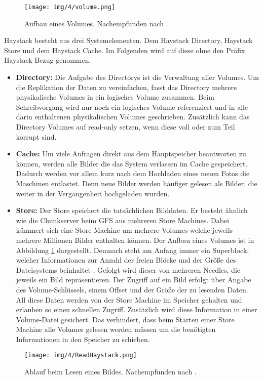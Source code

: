 \documentclass[12pt,oneside,a4paper,parskip]{scrbook}
\begin{document}
\begin{figure}
  \centering
  \texttt{[image: img/4/volume.png]}
  \caption[Aufbau eines Volumes]{ Aufbau eines Volumes. Nachempfunden nach \cite{haystack}.}
  \label{volume}
\end{figure}
Haystack besteht aus drei Systemelementen. Dem Haystack Directory, Haystack Store und dem Haystack Cache. Im Folgenden wird auf diese ohne den Präfix Haystack Bezug genommen.
\begin{itemize}
  \item \textbf{Directory:} Die Aufgabe des Directorys ist die Verwaltung aller Volumes. Um die Replikation der Daten zu vereinfachen, fasst das Directory mehrere physikalische Volumes in ein logisches Volume zusammen. Beim Schreibvorgang wird nur noch ein logisches Volume referenziert und in alle darin enthaltenen physikalischen Volumes geschrieben. Zusätzlich kann das Directory Volumes auf read-only setzen, wenn diese voll oder zum Teil korrupt sind.
  \item \textbf{Cache:} Um viele Anfragen direkt aus dem Hauptspeicher beantworten zu können, werden alle Bilder die das System verlassen im Cache gespeichert. Dadurch werden vor allem kurz nach dem Hochladen eines neuen Fotos die Maschinen entlastet. Denn neue Bilder werden häufiger gelesen als Bilder, die weiter in der Vergangenheit hochgeladen wurden. 
  \item \textbf{Store:} Der Store speichert die tatsächlichen Bilddaten. Er besteht ähnlich wie die Chunkserver beim GFS aus mehreren Store Machines. Dabei kümmert sich eine Store Machine um mehrere Volumes welche jeweils mehrere Millionen Bilder enthalten können. Der Aufbau eines Volumes ist in Abbildung \ref{volume} dargestellt. Demnach steht am Anfang immer ein Superblock, welcher Informationen zur Anzahl der freien Blöcke und der Größe des Dateisystems beinhaltet \cite{wiki:superblock}. Gefolgt wird dieser von mehreren Needles, die jeweils ein Bild repräsentieren. Der Zugriff auf ein Bild erfolgt über Angabe des Volume-Schlüssels, einem Offset und der Größe der zu lesenden Daten. All diese Daten werden von der Store Machine im Speicher gehalten und erlauben so einen schnellen Zugriff. Zusätzlich wird diese Information in einer Volume-Datei gesichert. Das verhindert, dass beim Starten einer Store Machine alle Volumes gelesen werden müssen um die benötigten Informationen in den Speicher zu schieben. 
\end{itemize}

\begin{figure}[h]
  \centering
  \texttt{[image: img/4/ReadHaystack.png]}
  \caption[Ablauf beim Lesen eines Bildes.]{ Ablauf beim Lesen eines Bildes. Nachempfunden nach \cite{haystack}.}
  \label{readHaystack}
\end{figure}
\end{document}
